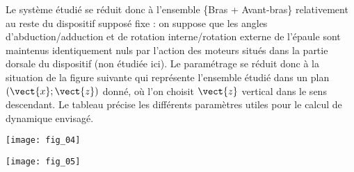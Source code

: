 \begin{multicols}{2}
Le système étudié se réduit donc à l’ensemble \{Bras + Avant-bras\} relativement au reste du dispositif supposé
fixe : on suppose que les angles d’abduction/adduction et de rotation interne/rotation externe de l’épaule sont
maintenus identiquement nuls par l’action des moteurs situés dans la partie dorsale du dispositif (non étudiée
ici). Le paramétrage se réduit donc à la situation de la figure suivante qui représente l’ensemble étudié dans un plan
$\left(\vect{x};\vect{z} \right)$ donné, où l’on choisit $\vect{z}$ vertical dans le sens descendant. Le tableau précise les différents
paramètres utiles pour le calcul de dynamique envisagé.

\begin{center}
\texttt{[image: fig\_04]}
\end{center}


\begin{center}
\texttt{[image: fig\_05]}
\end{center}




\end{multicols}
